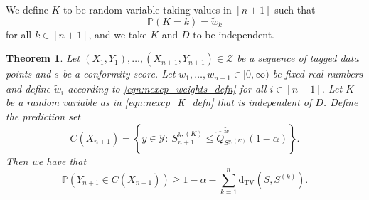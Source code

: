 \documentclass[11pt, titlepage]{article} %
\newcommand{\R}{\mathrm}
\newcommand{\Prob}[1]{\mathbb{P}\left( #1 \right)}
\numberwithin{equation}{section}
\newtheorem{theorem}{Theorem}
\theoremstyle{definition}
\numberwithin{theorem}{section}
\numberwithin{lemma}{section}
\numberwithin{corollary}{section}
\numberwithin{proposition}{section}
\numberwithin{definition}{section}
\numberwithin{remark}{section}
\begin{document}
\noindent
We define \(K\) to be random variable taking values in \([n+1]\) such that \begin{equation}
    \Prob{K = k} = \tilde{w}_k
\label{eqn:nexcp_K_defn}
\end{equation} for all \(k \in [n+1]\), and we take \(K\) and \(D\) to be independent.

\begin{theorem}
    Let \((X_1, Y_1), \ldots, (X_{n+1}, Y_{n+1}) \in \mathcal{Z}\) be a sequence of tagged data points and \(s\) be a conformity score. Let \(w_1, \ldots, w_{n+1} \in [0, \infty)\) be fixed real numbers and define \(\tilde{w}_i\) according to \eqref{eqn:nexcp_weights_defn} for all \(i \in [n+1]\). Let \(K\) be a random variable as in \eqref{eqn:nexcp_K_defn} that is independent of \(D\). Define the prediction set \begin{equation}
        C(X_{n+1}) = \left\{ y \in \mathcal{Y} : \ S_{n+1}^{y, (K)} \leq \hat{Q}_{S^{y, (K)}}^{\tilde{w}}(1-\alpha)  \right\}.
    \label{eqn:nexcp_prediction_set}
    \end{equation} Then we have that \begin{equation}
        \Prob{Y_{n+1} \in C(X_{n+1})}  \geq 1-\alpha - \sum_{k=1}^n \R{d_{TV}}(S, S^{(k)}).
    \end{equation}
\label{thm:nexCP_coverage}
\end{theorem}
\end{document}
